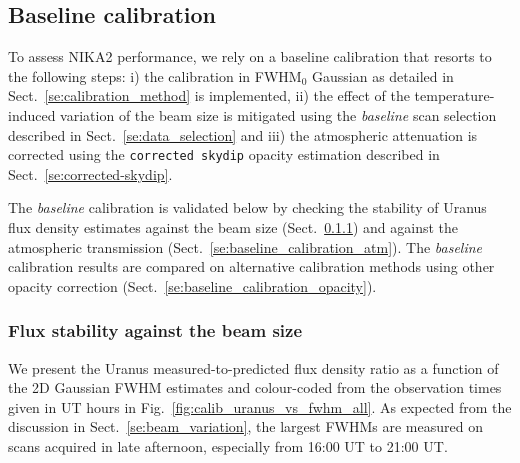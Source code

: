 \documentclass[traditionalabstract]{aa}
\newcommand{\lp}[1]{#1}
\begin{document}
\subsection{Baseline calibration}
\label{se:baseline_calibration}

To assess NIKA2 performance, we rely on a baseline calibration that
resorts to the following steps: i) the calibration in FWHM$_0$ Gaussian
as detailed in Sect.~\ref{se:calibration_method} is implemented, ii)
the effect of the temperature-induced variation of the beam size is
mitigated using the \emph{baseline} scan selection described in
Sect.~\ref{se:data_selection} and iii) the
atmospheric attenuation is corrected using the {\tt corrected skydip}
opacity estimation described in Sect.~\ref{se:corrected-skydip}.

The \emph{baseline} calibration is validated below by checking the
stability of Uranus flux density estimates against the beam size
(Sect.~\ref{se:baseline_calibration_scans}) and against the
atmospheric transmission
(Sect.~\ref{se:baseline_calibration_atm}). The \emph{baseline}
calibration results are compared on alternative calibration methods
using other opacity correction (Sect.~\ref{se:baseline_calibration_opacity}).


\subsubsection{Flux stability against the beam size}
\label{se:baseline_calibration_scans}

We present the Uranus measured-to-predicted flux density ratio as a
function of the 2D Gaussian FWHM estimates and colour-coded from the
observation times given in UT hours in
Fig.~\ref{fig:calib_uranus_vs_fwhm_all}. {\lp As expected from the
discussion in Sect.~\ref{se:beam_variation}, the largest FWHMs are
measured on scans acquired in late afternoon, especially from 16:00 UT
to 21:00 UT.}  
\end{document}
